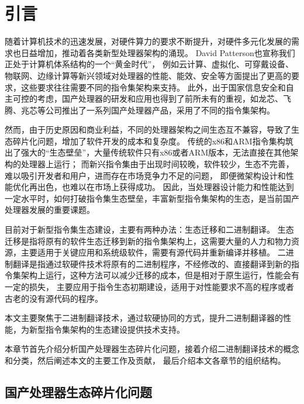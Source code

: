 \chapter{引言}\label{chap:introduction}


随着计算机技术的迅速发展，对硬件算力的要求不断提升，对硬件多元化发展的需求也日益增加，推动着各类新型处理器架构的涌现。
David Patterson也宣称我们正处于计算机体系结构的一个“黄金时代”\cite{goldenage}，
例如云计算、虚拟化、可穿戴设备、物联网、边缘计算等新兴领域对处理器的性能、能效、安全等方面提出了更高的要求，这些要求往往需要不同的指令集架构来支持。
此外，出于国家信息安全和自主可控的考虑，国产处理器的研发和应用也得到了前所未有的重视，如龙芯、飞腾、兆芯等公司推出了一系列国产处理器产品，采用了不同的指令集架构。

然而，由于历史原因和商业利益，不同的处理器架构之间生态互不兼容，导致了生态碎片化问题，增加了软件开发的成本和复杂度。
传统的x86和ARM指令集构筑出了强大的“生态壁垒”，大量传统软件只有x86或者ARM版本，无法直接在其他架构的处理器上运行；
而新兴指令集由于出现时间较晚，软件较少，生态不完善，难以吸引开发者和用户，进而存在市场竞争力不足的问题，
即便微架构设计和性能优化再出色，也难以在市场上获得成功。
因此，当处理器设计能力和性能达到一定水平时，如何打破指令集生态壁垒，丰富新型指令集架构的生态，是当前国产处理器发展的重要课题。

目前对于新型指令集生态建设，主要有两种办法：生态迁移和二进制翻译。
生态迁移是指将原有的软件生态迁移到新的指令集架构上，这需要大量的人力和物力资源，主要适用于关键应用和系统级软件，需要有源代码并重新编译并移植。
二进制翻译是指通过软硬件技术将原有的二进制程序，不经修改的、直接翻译到新的指令集架构上运行，这种方法可以减少迁移的成本，但是相对于原生运行，性能会有一定的损失，
主要应用于指令生态初期建设，适用于对性能要求不高的程序或者古老的没有源代码的程序。

本文主要聚焦于二进制翻译技术，通过软硬协同的方式，提升二进制翻译器的性能，为新型指令集架构的生态建设提供技术支持。

本章节首先介绍分析国产处理器生态碎片化问题，接着介绍二进制翻译技术的概念和分类，然后阐述本文的主要工作及贡献，
最后介绍本文各章节的组织结构。

\section{国产处理器生态碎片化问题}

